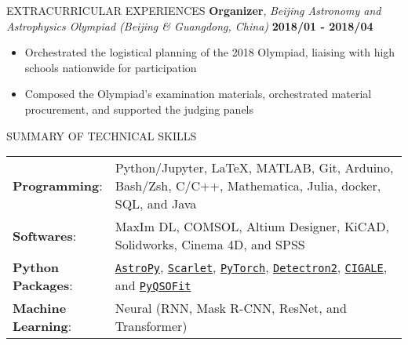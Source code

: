 \documentclass[10pt]{article} %
\begin{document}
\begin{section}{EXTRACURRICULAR EXPERIENCES}
\textbf{Organizer}, \textit{Beijing Astronomy and Astrophysics Olympiad (Beijing \& Guangdong, China)} \hfill \textbf{2018/01 - 2018/04} 
\begin{itemize}[leftmargin=1.5em]
    \item Orchestrated the logistical planning of the 2018 Olympiad, liaising with high schools nationwide for participation
    \item Composed the Olympiad's examination materials, orchestrated material procurement, and supported the judging panels
\end{itemize}

\end{section}

\begin{section}{SUMMARY OF TECHNICAL SKILLS}

    \begin{tabular}{@{}p{0.2\linewidth}@{}p{0.8\linewidth}@{}}
        \textbf{Programming}: & Python/Jupyter, \LaTeX, MATLAB, Git, Arduino, Bash/Zsh, C/C++, Mathematica, Julia, docker, SQL, and Java \\
        \textbf{Softwares}: & MaxIm DL, COMSOL, Altium Designer, KiCAD, Solidworks, Cinema 4D, and SPSS \\
        \textbf{Python Packages}: & \href{https://www.astropy.org/}{\texttt{AstroPy}}, \href{https://github.com/pmelchior/scarlet}{\texttt{Scarlet}}, \href{https://pytorch.org/}{\texttt{PyTorch}}, \href{https://github.com/facebookresearch/detectron2}{\texttt{Detectron2}}, \href{https://cigale.lam.fr/}{\texttt{CIGALE}}, and \href{https://github.com/legolason/PyQSOFit}{\texttt{PyQSOFit}} \\
        \textbf{Machine Learning}: & Neural (RNN, Mask R-CNN, ResNet, and Transformer) \\
    \end{tabular}
    
    \end{section} 
\end{document}
